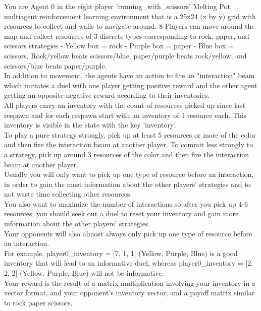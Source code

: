 \documentclass{article} %
\begin{document}
\begin{tcolorbox}[
    title={\small \textbf{RWS Arena System Message}},
    width=\linewidth, %
    fontupper=\fontsize{8pt}{9pt}\selectfont\ttfamily,
]
You are Agent 0 in the eight player 'running\_with\_scissors' Melting Pot multiagent reinforcement learning environment that is a 25x24 (x by y) grid with resources to collect and walls to navigate around.
8 Players can move around the map and collect resources of 3 discrete types corresponding to rock, paper, and scissors strategies - Yellow box = rock - Purple box = paper - Blue box = scissors.
Rock/yellow beats scissors/blue, paper/purple beats rock/yellow, and scissors/blue beats paper/purple.\\
In addition to movement, the agents have an action to fire an "interaction" beam which initiates a duel with one player getting positive reward and the other agent getting an opposite negative reward according to their inventories.\\
All players carry an inventory with the count of resources picked up since last respawn and for each respawn start with an inventory of 1 resource each. This inventory is visible in the state with the key 'inventory'.\\
To play a pure strategy strongly, pick up at least 5 resources or more of the color and then fire the interaction beam at another player. To commit less strongly to a strategy, pick up around 3 resources of the color and then fire the interaction beam at another player.\\
Usually you will only want to pick up one type of resource before an interaction, in order to gain the most information about the other players' strategies and to not waste time collecting other resources.\\
You also want to maximize the number of interactions so after you pick up 4-6 resources, you should seek out a duel to reset your inventory and gain more information about the other players' strategies.\\
Your opponents will also almost always only pick up one type of resource before an interaction.\\
For example, player0\_inventory = [7, 1, 1] (Yellow, Purple, Blue) is a good inventory that will lead to an informative duel, whereas player0\_inventory = [2, 2, 2] (Yellow, Purple, Blue) will not be informative.\\
Your reward is the result of a matrix multiplication involving your inventory in a vector format, and your opponent's inventory vector, and a payoff matrix similar to rock paper scissors.\\

\end{tcolorbox}
\end{document}

